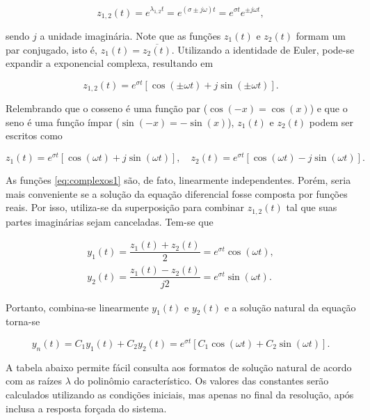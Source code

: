 \documentclass{article}
\numberwithin{equation}{section}
\let\dfr\dfrac
\begin{document}
\begin{equation*}
    z_{1,2}(t)=e^{\lambda_{1,2} t} = e^{(\sigma \pm j\omega) t} = e^{\sigma t}e^{\pm j\omega t},
\end{equation*}

\noindent sendo $j$ a unidade imaginária. Note que as funções $z_1(t)$ e $z_2(t)$ formam um par conjugado, isto é, $z_1(t)=\overline{z_2(t)}$. Utilizando a identidade de Euler, pode-se expandir a exponencial complexa, resultando em

\begin{equation*}
    z_{1,2}(t)=e^{\sigma t}[\cos{(\pm \omega t)}+j\sin{(\pm \omega t)}].
\end{equation*}

\noindent Relembrando que o cosseno é uma função par ($\cos(-x) = \cos(x)$) e que o seno é uma função ímpar ($\sin(-x) = -\sin(x)$), $z_1(t)$ e $z_2(t)$ podem ser escritos como

\begin{equation}
    z_1(t) = e^{\sigma t}[\cos{(\omega t)}+j\sin{(\omega t)}], \quad
    z_2(t) = e^{\sigma t}[\cos{(\omega t)}-j\sin{(\omega t)}]. \label{eq:complexos1}
\end{equation}

\noindent As funções \eqref{eq:complexos1} são, de fato, linearmente independentes. Porém, seria mais conveniente se a solução da equação diferencial fosse composta por funções reais. Por isso, utiliza-se da superposição para combinar $z_{1,2}(t)$ tal que suas partes imaginárias sejam canceladas. Tem-se que

\begin{gather*}
    y_1(t) = \dfr{z_1(t)+z_2(t)}{2} = e^{\sigma t}\cos(\omega t),
    \\
    y_2(t) = \dfr{z_1(t)-z_2(t)}{j2} = e^{\sigma t}\sin(\omega t).
\end{gather*}

\noindent Portanto, combina-se linearmente $y_1(t)$ e $y_2(t)$ e a solução natural da equação torna-se

\begin{equation}
    y_n(t) = C_1y_1(t) + C_2y_2(t) = e^{\sigma t}[C_1\cos(\omega t)+C_2\sin(\omega t)].
\end{equation}

\vspace{4mm}

A tabela abaixo permite fácil consulta aos formatos de solução natural de acordo com as raízes $\lambda$ do polinômio característico. Os valores das constantes serão calculados utilizando as condições iniciais, mas apenas no final da resolução, após inclusa a resposta forçada do sistema.
\end{document}
